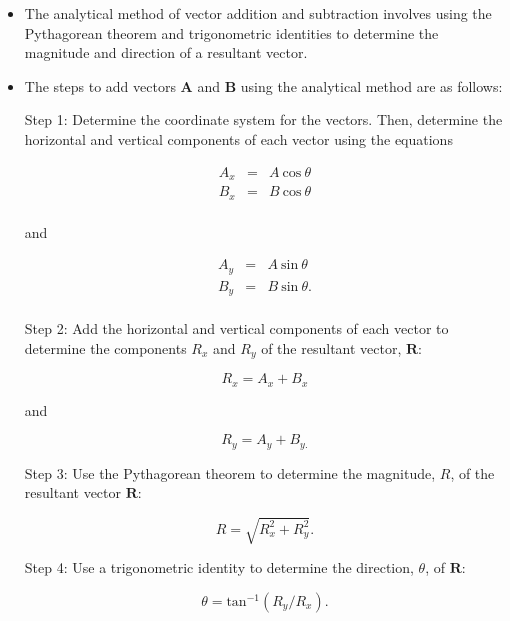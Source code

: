 \documentclass[
]{book}
\begin{document}
\begin{itemize}
\item
  \protect\hypertarget{import-auto-id1165296238488}{}{The analytical method of vector addition and subtraction involves
  using the Pythagorean theorem and trigonometric identities to
  determine the magnitude and direction of a resultant
  vector.}
\item
  \protect\hypertarget{import-auto-id1165296238492}{}{The steps to add vectors \(\mathbf{A}{}\) and \(\mathbf{B}{}\) using
  the analytical method are as follows:}

  Step 1: Determine the coordinate system for the vectors. Then,
  determine the horizontal and vertical components of each vector
  using the equations

  \leavevmode\hypertarget{import-auto-id1165298699812}{}%
  \[\begin{array}{lll}
  A_{x} & = & {A\ \text{cos}\ \theta} \\
  B_{x} & = & {B\ \text{cos}\ \theta} \\
  \end{array}{}\]

  and

  \leavevmode\hypertarget{import-auto-id1165298717989}{}%
  \[\begin{array}{lll}
  A_{y} & = & {A\ \text{sin}\ \theta} \\
  B_{y} & = & {B\ \text{sin}\ \theta\text{.}} \\
  \end{array}{}\]

  Step 2: Add the horizontal and vertical components of each vector to
  determine the components \(R_{x}{}\) and \(R_{y}{}\) of the resultant
  vector, \(\textbf{R}{}\):

  \leavevmode\hypertarget{import-auto-id1165298564746}{}%
  \[{R_{x} = {A_{x} + B_{x}}}{}\]

  and

  \leavevmode\hypertarget{import-auto-id1165298586327}{}%
  \[{R_{y} = {A_{y} + B_{y.}}}{}\]

  Step 3: Use the Pythagorean theorem to determine the magnitude,
  \(R{}\), of the resultant vector \(\textbf{R}{}\):

  \leavevmode\hypertarget{import-auto-id1165298936413}{}%
  \[{R = \sqrt{R_{x}^{2} + R_{y}^{2}}}{}.\]

  Step 4: Use a trigonometric identity to determine the direction,
  \(\theta{}\), of \(\textbf{R}{}\):

  \leavevmode\hypertarget{import-auto-id1165296245925}{}%
  \[{{\theta = \text{tan}^{- 1}}({R_{y}/R_{x}}).}{}\]
\end{itemize}
\end{document}
